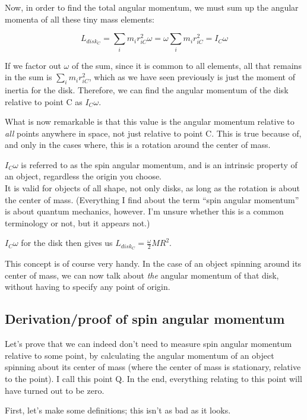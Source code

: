 Now, in order to find the total angular momentum, we must sum up the angular momenta of all these tiny mass elements:

\begin{equation}
L_{disk_C} = \sum_i m_i r_{iC}^2 \omega = \omega \sum_i m_i r_{iC}^2 = I_C \omega
\end{equation}

If we factor out $\omega$ of the sum, since it is common to all elements, all that remains in the sum is $\sum_i m_i r_{iC}^2$, which as we have seen previously is just the moment of inertia for the disk. Therefore, we can find the angular momentum of the disk relative to point C as $I_C \omega$.

What is now remarkable is that this value is the angular momentum relative to \emph{all} points anywhere in space, not just relative to point C. This is true because of, and only in the cases where, this is a rotation around the center of mass.

$I_C \omega$ is referred to as the spin angular momentum, and is an intrinsic property of an object, regardless the origin you choose.\\
It is valid for objects of all shape, not only disks, as long as the rotation is about the center of mass.
(Everything I find about the term ``spin angular momentum'' is about quantum mechanics, however. I'm unsure whether this is a common terminology or not, but it appears not.)

$I_C \omega$ for the disk then gives us $\displaystyle L_{disk_C} = \frac{\omega}{2} M R^2$.

This concept is of course very handy. In the case of an object spinning around its center of mass, we can now talk about \emph{the} angular momentum of that disk, without having to specify any point of origin.

\subsection{Derivation/proof of spin angular momentum}

Let's prove that we can indeed don't need to measure spin angular momentum relative to some point, by calculating the angular momentum of an object spinning about its center of mass (where the center of mass is stationary, relative to the point). I call this point Q. In the end, everything relating to this point will have turned out to be zero.

First, let's make some definitions; this isn't as bad as it looks.


